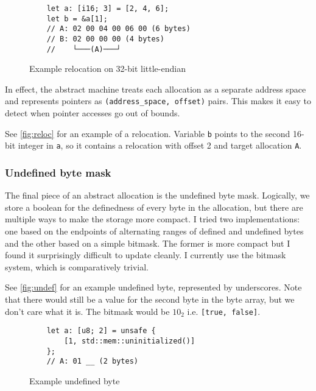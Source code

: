 \documentclass[twocolumn]{article}
\newcommand{\rust}[1]{\texttt{#1}}
\begin{document}
\begin{figure}[ht]
  \begin{verbatim}
    let a: [i16; 3] = [2, 4, 6];
    let b = &a[1];
    // A: 02 00 04 00 06 00 (6 bytes)
    // B: 02 00 00 00 (4 bytes)
    //    └───(A)───┘
  \end{verbatim}
  \caption{Example relocation on 32-bit little-endian}
  \label{fig:reloc}
\end{figure}

In effect, the abstract machine treats each allocation as a separate address space and represents
pointers as \rust{(address_space, offset)} pairs. This makes it easy to detect when pointer accesses
go out of bounds.

See \autoref{fig:reloc} for an example of a relocation. Variable \rust{b} points to the second
16-bit integer in \rust{a}, so it contains a relocation with offset 2 and target allocation
\rust{A}.

\subsubsection{Undefined byte mask}

The final piece of an abstract allocation is the undefined byte mask. Logically, we store a boolean
for the definedness of every byte in the allocation, but there are multiple ways to make the storage
more compact. I tried two implementations: one based on the endpoints of alternating ranges of
defined and undefined bytes and the other based on a simple bitmask. The former is more compact but
I found it surprisingly difficult to update cleanly. I currently use the bitmask system, which is
comparatively trivial.

See \autoref{fig:undef} for an example undefined byte, represented by underscores. Note that there
would still be a value for the second byte in the byte array, but we don't care what it is. The
bitmask would be $10_2$ i.e. \rust{[true, false]}.

\begin{figure}[hb]
  \begin{verbatim}
    let a: [u8; 2] = unsafe {
        [1, std::mem::uninitialized()]
    };
    // A: 01 __ (2 bytes)
  \end{verbatim}
  \caption{Example undefined byte}
  \label{fig:undef}
\end{figure}

\end{document}
